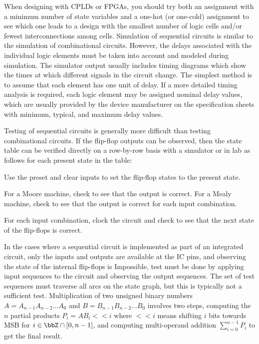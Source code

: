 \documentclass[a4paper,12pt]{report}
\begin{document}
When designing with CPLDs or FPGAs, you should try both an assignment with a minimum number of state variables and a one-hot (or one-cold) assignment to see which one leads to a design with the smallest number of logic cells and/or fewest interconnections among cells.
Simulation of sequential circuits is similar to the simulation of combinational circuits. However, the delays associated with the individual logic elements must be taken into account and modeled during simulation. The simulator output usually includes timing diagrams which show the times at which different signals in the circuit change. The simplest method is to assume that each element has one unit of delay. If a more detailed timing analysis is required, each logic element may be assigned nominal delay values, which are usually provided by the device manufacturer on the specification sheets with minimum, typical, and maximum delay values.

Testing of sequential circuits is generally more difficult than testing combinational circuits. If the flip-flop outputs can be observed, then the state table can be verified directly on a row-by-row basis with a simulator or in lab as follows for each present state in the table:
\ben
\item Use the preset and clear inputs to set the flip-flop states to the present state.
\item For a Moore machine, check to see that the output is correct. For a Mealy machine, check to see that the output is correct for each input combination.
\item For each input combination, clock the circuit and check to see that the next state of the flip-flops is correct.
\een

In the cases where a sequential circuit is implemented as part of an integrated circuit, only the inputs and outputs are available at the IC pins, and observing the state of the internal flip-flops is Impossible, test must be done by applying input sequences to the circuit and observing the output sequences. The set of test sequences must traverse all arcs on the state graph, but this is typically not a sufficient test.
Multiplication of two unsigned binary numbers $A=A_{n-1}A_{n-2}\ldots A_0$ and $B=B_{n-1}B_{n-2}\ldots B_0$ involves two steps, computing the $n$ partial products $P_i=AB_i<<i$ where $<<i$ means shifting $i$ bits towards MSB for $i\in\bbZ\cap[0,n-1]$, and computing multi-operand addition $\sum_{i=0}^{n-1}P_i$ to get the final result.
\end{document}
